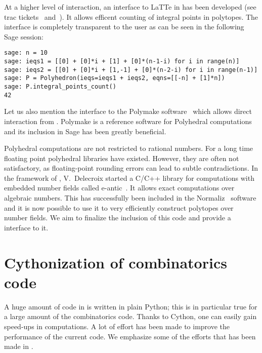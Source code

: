 \documentclass{deliverablereport}
\begin{document}
At a higher level of interaction, an interface to LaTTe in \Sage has
been developed (see trac tickets~\cite{trac-18211}
and~\cite{trac-22497}). It allows efficent counting of
integral points in polytopes. The interface is completely transparent to the
user as can be seen in the following Sage session:
\begin{verbatim}
sage: n = 10
sage: ieqs1 = [[0] + [0]*i + [1] + [0]*(n-1-i) for i in range(n)]
sage: ieqs2 = [[0] + [0]*i + [1,-1] + [0]*(n-2-i) for i in range(n-1)]
sage: P = Polyhedron(ieqs=ieqs1 + ieqs2, eqns=[[-n] + [1]*n])
sage: P.integral_points_count()
42
\end{verbatim}
Let us also mention the \Sage interface to the Polymake
software~\cite{polymake-code} which allows direct interaction from
\Sage. Polymake is a reference software for Polyhedral computations
and its inclusion in Sage has been greatly beneficial.

Polyhedral computations are not restricted to rational numbers. For a long time
floating point polyhedral libraries have existed. However, they are often not
satisfactory, as floating-point rounding errors can lead to subtle contradictions. In the framework
of \ODK, V.~Delecroix started a C/C++ library for computations with embedded
number fields called e-antic~\cite{eantic-code}. It allows exact computations
over algebraic numbers. This has successfully been included in the
Normaliz~\cite{normaliz-code} software and it is now possible to use
it to very efficiently construct polytopes over number fields. We aim to
finalize the inclusion of this code and provide a \Sage interface to it.


\section{Cythonization of combinatorics code}

A huge amount of code in \Sage is written in plain Python; this is in
particular true for a large amount of the combinatorics code. Thanks to
Cython, one can easily gain speed-ups in computations. A lot of effort has
been made to improve the performance of the current code. We emphasize
some of the efforts that has been made in \ODK.
\end{document}
